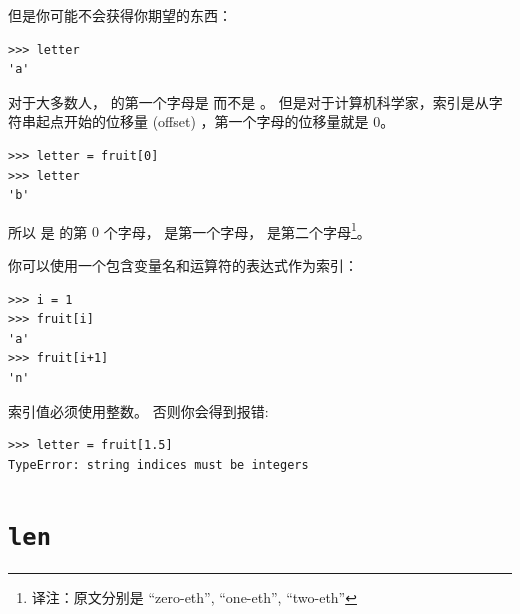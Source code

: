 
但是你可能不会获得你期望的东西：

\begin{lstlisting}
>>> letter
'a'
\end{lstlisting}

%

对于大多数人， 的第一个字母是  而不是 。
但是对于计算机科学家，索引是从字符串起点开始的位移量 (offset) ，第一个字母的位移量就是 0。

\begin{lstlisting}
>>> letter = fruit[0]
>>> letter
'b'
\end{lstlisting}

%

所以  是  的第 $0$ 个字母，  是第一个字母，  是第二个字母\footnote{译注：原文分别是 ``zero-eth'', ``one-eth'', ``two-eth''}。


你可以使用一个包含变量名和运算符的表达式作为索引：

\begin{lstlisting}
>>> i = 1
>>> fruit[i]
'a'
>>> fruit[i+1]
'n'
\end{lstlisting}

%

  

索引值必须使用整数。 否则你会得到报错:

\begin{lstlisting}
>>> letter = fruit[1.5]
TypeError: string indices must be integers
\end{lstlisting}


%
\section{{\tt len}}
  

